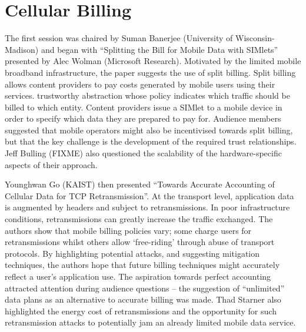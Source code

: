 \section{Cellular Billing}
\label{sec:cellbilling}

The first session was chaired by Suman Banerjee (University of Wisconsin-Madison)
and began with ``Splitting the Bill for Mobile Data with SIMlets'' presented by 
Alec Wolman (Microsoft Research). Motivated by the limited mobile broadband 
infrastructure, the paper suggests the use of split billing. Split billing allows 
content providers to pay costs generated by mobile users using their services.
trustworthy abstraction whose policy indicates which traffic should be billed to 
which entity. Content providers issue a SIMlet to a mobile device in order to 
specify which data they are prepared to pay for.
Audience members suggested that mobile operators might also be incentivised 
towards split billing, but that the key challenge is the development of the 
required trust relationships. Jeff Bulling (FIXME) also questioned the 
scalability of the hardware-specific aspects of their approach.

Younghwan Go (KAIST) then presented ``Towards Accurate Accounting of Cellular 
Data for TCP Retransmission''. At the transport level, application data
is augmented by headers and subject to retransmissions. In 
poor infrastructure conditions, retransmissions can greatly increase the traffic 
exchanged. The authors show that mobile billing policies vary; some charge users 
for retransmissions whilst others allow `free-riding' through abuse of transport 
protocols. By highlighting potential attacks, and suggesting mitigation 
techniques, the authors hope that future billing techniques might accurately 
reflect a user's application use.
The aspiration towards perfect accounting attracted attention during audience
questions -- the suggestion of ``unlimited'' data plans as an
alternative to accurate billing was made. Thad Starner also highlighted the 
energy cost of retransmissions %
and the opportunity for such retransmission attacks to potentially jam an already 
limited mobile data service.
